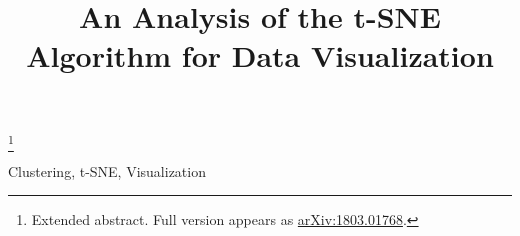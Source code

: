 \documentclass[final,12pt]{colt2018} %
\title{An Analysis of the t-SNE Algorithm for Data Visualization}
\newcommand\blfootnote[1]{%
	\begingroup
	\renewcommand\thefootnote{}\footnote{#1}%
	\addtocounter{footnote}{-1}%
	\endgroup
}
\begin{document}
\blfootnote{Extended abstract. Full version appears as \hyperref{https://arxiv.org/abs/1803.01768}{}{}{arXiv:1803.01768}.}

\maketitle
\begin{abstract}%

\end{abstract}

\begin{keywords}
Clustering, t-SNE, Visualization	
\end{keywords}




%

%

%

%

%














%
%
\end{document}
